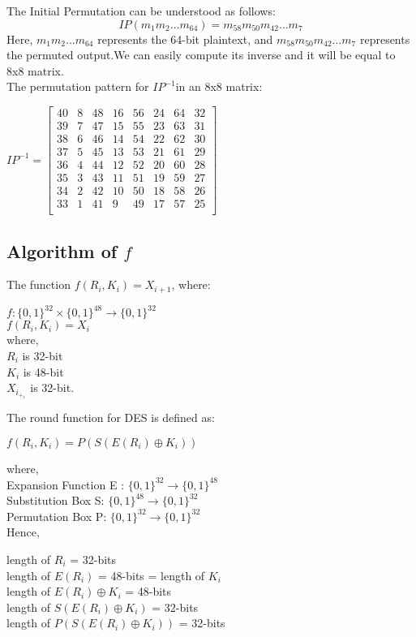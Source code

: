 \documentclass[11pt]{article}
\begin{document}
The Initial Permutation can be understood as follows:
\[IP(m_1m_2 \ldots m_{64}) = m_{58}m_{50}m_{42} \ldots m_7\]
Here, \(m_1m_2 \ldots m_{64}\) represents the 64-bit plaintext, and \(m_{58}m_{50}m_{42} \ldots m_7\) represents the permuted output.We can easily compute its inverse and it will be equal to 8x8 matrix.\\
The permutation pattern for $IP^{-1}$in an 8x8 matrix:
\begin{center}
    $IP^{-1} = 
    \begin{bmatrix}
        40 & 8 & 48 & 16 & 56 & 24 & 64 & 32\\
        39 & 7 & 47 & 15 & 55 & 23 & 63 & 31\\
        38 & 6 & 46 & 14 & 54 & 22 & 62 & 30\\
        37 & 5 & 45 & 13 & 53 & 21 & 61 & 29\\
        36 & 4 & 44 & 12 & 52 & 20 & 60 & 28\\
        35 & 3 & 43 & 11 & 51 & 19 & 59 & 27\\
        34 & 2 & 42 & 10 & 50 & 18 & 58 & 26\\
        33 & 1 & 41 & 9 & 49 & 17 & 57 & 25\\
    \end{bmatrix}$\\
\end{center}

\subsection*{Algorithm of $f$}
The function \(f(R_i, K_i) = X_{i+1}\), where:
\begin{center}
    $f: \{0,1\}^{32} \times \{0,1\}^{48} \rightarrow \{0,1\}^{32}$\\
    $f(R_i, K_i) = X_i$\\
    where,\\
    $R_i$ is 32-bit\\
    $K_i$ is 48-bit\\
    $X_i_+_1$ is 32-bit.
\end{center}
The round function for DES is defined as:
\begin{center}
    $f(R_i, K_i) = P(S(E(R_i) \oplus K_i))$\\
\end{center}
where,\\
    Expansion Function E : $\{0, 1\}^{32} \rightarrow \{0, 1\}^{48}$\\
    Substitution Box S: $\{0, 1\}^{48} \rightarrow \{0, 1\}^{32}$\\
    Permutation Box P: $\{0, 1\}^{32} \rightarrow \{0, 1\}^{32}$\\
Hence,
\begin{center}
    length of $R_i$ = 32-bits\\
    length of $E(R_i)$ = 48-bits = length of $K_i$\\
    length of $E(R_i) \oplus K_i$ = 48-bits\\
    length of $S(E(R_i) \oplus K_i)$ = 32-bits\\
    length of $P(S(E(R_i) \oplus K_i))$ = 32-bits
\end{center}
\end{document}
